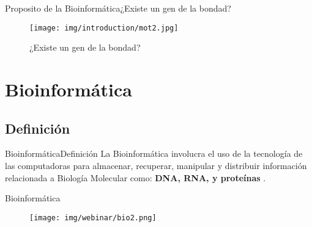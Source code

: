 \documentclass[10pt]{beamer}
\newcommand{\1}{
        	\setbeamertemplate{background}{
        		\texttt{[image: img/1]}
        		\tikz[overlay] \fill[fill opacity=0.75,fill=white] (0,0) rectangle (-\paperwidth,\paperheight);
        	}
}
\begin{document}
\begin{frame}{Proposito de la Bioinformática}{¿Existe un gen de la bondad?}
	\begin{figure}[]
		\centering
		\texttt{[image: img/introduction/mot2.jpg]}
		\caption{¿Existe un gen de la bondad?}
	\end{figure}
\end{frame}

\section{Bioinformática}

\subsection{Definición}

\begin{frame}{Bioinformática}{Definición}	
	La Bioinformática involucra el uso de la tecnología de las computadoras para almacenar, recuperar, manipular y distribuir información relacionada a Biología Molecular como: \textbf{DNA, RNA, y proteínas} \cite{luscombe2001bioinformatics}.
	
\end{frame}


\begin{frame}{Bioinformática}
	\begin{figure}[]
		\centering
		\texttt{[image: img/webinar/bio2.png]}
		\label{img:mot2}
	\end{figure}
\end{frame}
\end{document}
